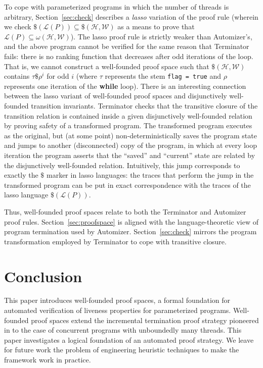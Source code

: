 \documentclass[9pt,nocopyrightspace]{sigplanconf}
\theoremstyle{definition}
\newcommand{\rankformulas}{\mathscr{W}}
\newcommand{\lang}{\mathcal{L}}
\begin{document}
To cope with parameterized programs in which the number of threads is
arbitrary, Section~\ref{sec:check} describes a \emph{lasso} variation of the
proof rule (wherein we check $\$(\lang(P)) \subseteq
\$(\mathscr{H},\rankformulas)$ as a means to prove that $\lang(P) \subseteq
\omega(\mathscr{H},\rankformulas)$).  The lasso proof rule is strictly weaker
than Automizer's, and the above program cannot be verified for the same reason
that Terminator fails: there is no ranking function that decreases after odd
iterations of the loop.  That is, we cannot construct a well-founded proof
space such that $\$(\mathscr{H},\rankformulas)$ contains $\tau\$\rho^i$ for
odd $i$ (where $\tau$ represents the stem \texttt{flag = true} and $\rho$
represents one iteration of the \textbf{while} loop).  There is an interesting
connection between the lasso variant of well-founded proof spaces and
disjunctively well-founded transition invariants.  Terminator checks that the
transitive closure of the transition relation is contained inside a given
disjunctively well-founded relation by proving safety of a transformed
program.  The transformed program executes as the original, but (at some
point) non-deterministically saves the program state and jumps to another
(disconnected) copy of the program, in which at every loop iteration the
program asserts that the ``saved'' and ``current'' state are related by the
disjunctively well-founded relation.  Intuitively, this jump corresponds to
exactly the $\$$ marker in lasso languages: the traces that perform the jump
in the transformed program can be put in exact correspondence with the traces
of the lasso language $\$(\lang(P))$.



Thus, well-founded proof spaces relate to both the Terminator and Automizer
proof rules.  Section~\ref{sec:proofspace} is aligned with the
language-theoretic view of program termination used by Automizer.
Section~\ref{sec:check} mirrors the program transformation employed by
Terminator to cope with transitive closure.



\section{Conclusion} \label{sec:conclusion}

This paper introduces well-founded proof spaces, a formal foundation for
automated verification of liveness properties for parameterized programs.
Well-founded proof spaces extend the incremental termination proof strategy pioneered in
\cite{Cook2005,pldi/CookPR06} to the case of concurrent programs with unboundedly many
threads.  This paper investigates a
logical foundation of an automated proof strategy.  We leave for future work
the problem of engineering heuristic techniques to make the framework work in
practice.
\end{document}
